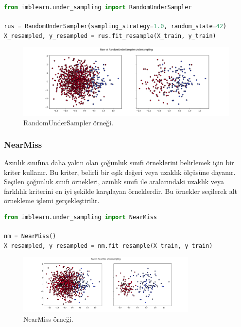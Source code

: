 \begin{lstlisting}[language=Python]
from imblearn.under_sampling import RandomUnderSampler

rus = RandomUnderSampler(sampling_strategy=1.0, random_state=42)
X_resampled, y_resampled = rus.fit_resample(X_train, y_train)
\end{lstlisting}

\begin{figure}[h]
    \centering
    \includegraphics[width=1\textwidth]{images/Raw vs RandomUnderSampler undersampling.png}
    \caption{RandomUnderSampler örneği.}
    \label{fig:enter-label}
\end{figure}

\newpage

\subsubsection{NearMiss}
Azınlık sınıfına daha yakın olan çoğunluk sınıfı örneklerini belirlemek için bir kriter kullanır. Bu kriter, belirli bir eşik değeri veya uzaklık ölçüsüne dayanır. Seçilen çoğunluk sınıfı örnekleri, azınlık sınıfı ile aralarındaki uzaklık veya farklılık kriterini en iyi şekilde karşılayan örneklerdir. Bu örnekler seçilerek alt örnekleme işlemi gerçekleştirilir.

\begin{lstlisting}[language=Python]
from imblearn.under_sampling import NearMiss

nm = NearMiss()
X_resampled, y_resampled = nm.fit_resample(X_train, y_train)
\end{lstlisting}

\begin{figure}[h]
    \centering
    \includegraphics[width=0.8\textwidth]{images/Raw vs NearMiss undersampling.png}
    \caption{NearMiss örneği.}
    \label{fig:enter-label}
\end{figure}

